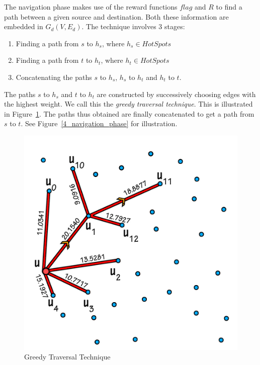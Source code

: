 \documentclass[10pt, conference, compsocconf]{IEEEtran}
\begin{document}
The navigation phase makes use of the reward functions $flag$ and $R$ to find a path between a given source and destination. Both these information are embedded in $G_d(V,E_d)$. 
The technique involves 3 stages:

\begin{enumerate}
\item Finding a path from $s$ to $h_s$, where $h_s\in HotSpots$
\item Finding a path from $t$ to $h_t$, where $h_t \in HotSpots$
\item Concatenating the paths $s$ to $h_s$, $h_s$ to $h_t$ and $h_t$ to $t$.
\end{enumerate}

The paths $s$ to $h_s$ and $t$ to $h_t$ are constructed by successively choosing edges with the highest weight. We call this the \emph{greedy traversal technique}. This is illustrated in Figure~\ref{4_greedy_traversal}. The paths thus obtained are finally concatenated to get a path from $s$ to $t$. See Figure~\ref{4_navigation_phase} for illustration.

\begin{figure}[htp]
\centering
\includegraphics[scale=0.17]{Results/greedynavigation.jpg}
\caption{Greedy Traversal Technique}
\label{4_greedy_traversal}
\end{figure}
\end{document}
